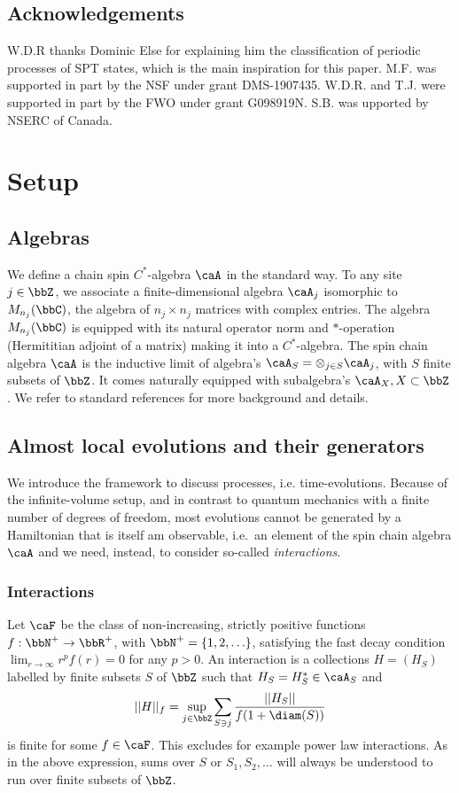 \subsection*{Acknowledgements}
W.D.R thanks Dominic Else for explaining him the classification of periodic processes of SPT states, which is the main inspiration for this paper.    M.F. was supported in part by the NSF under grant DMS-1907435. W.D.R. and T.J. were supported in part by the FWO under grant G098919N. S.B. was upported by NSERC of Canada.

\section{Setup}   \label{sec: setup}
\subsection{Algebras}
We define a chain spin $C^*$-algebra $\caA$ in the standard way.
To any site $j \in \bbZ$, we associate a finite-dimensional algebra $\caA_j$ isomorphic to  $M_{n_j}(\bbC)$, the algebra of $n_j\times n_j$ matrices with complex entries. The algebra $M_{n_j}(\bbC)$ is equipped with its natural operator norm and $*$-operation (Hermititian adjoint of a matrix) making it into a $C^*$-algebra.  The spin chain algebra $\caA$ is the inductive limit of 
algebra's $\caA_S=\otimes_{j\in S} \caA_j$, with  $S$ finite subsets of $\bbZ$. 
It comes naturally equipped with subalgebra's $\caA_X, X\subset \bbZ$. We refer to standard references \cite{BratRob2,simon2014statistical,naaijkens2017quantum} for more background and details.





\subsection{Almost local evolutions and their generators}
We introduce the framework to discuss processes, i.e. time-evolutions.  Because of the infinite-volume setup, and in contrast to quantum mechanics with a finite number of degrees of freedom, most evolutions cannot be generated by a Hamiltonian that is itself am observable, i.e.\ an element of the  spin chain algebra $\caA$ and we need, instead, to consider so-called \emph{interactions}.  

\subsubsection{Interactions}\label{sec: interactions}
Let $\caF$ be the class of non-increasing, strictly positive functions $f:\bbN^+\to\bbR^+$, with $\bbN^+=\{1,2,\ldots\}$, satisfying the fast decay condition $\lim_{r\to\infty}r^pf(r)=0$ for any $p>0$. 
An interaction is a collections $H=(H_S)$ labelled by finite subsets $S$ of $\bbZ$ such that $H_S=H^*_S \in\caA_S$ and
$$
|| H ||_f  = \sup_{j\in\bbZ}  \sum_{S \ni j} \frac{||H_S||}{f(1+\diam(S))}
$$
is finite for some $f \in\caF$. This excludes for example power law interactions. As in the above expression, sums over $S$ or $S_1,S_2,\ldots$ will always be understood to run over  finite subsets of $\bbZ$.


